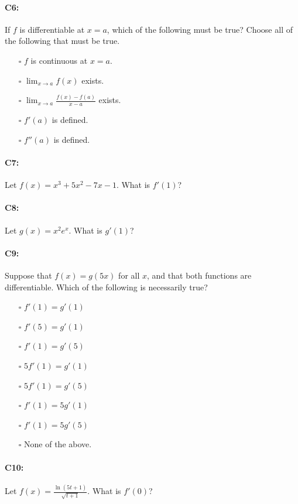 \documentclass[pdftex, brazil, 12pt, twoside]{article}
\begin{document}
\paragraph{C6:} If $f$ is differentiable at $x=a$, which of the following must be true? Choose all of the following that must be true.

\begin{itemize}[noitemsep]
\item[$\square$] $f$ is continuous at $x=a$.
\item[$\square$] $\lim_{x \to a} f(x)$ exists.
\item[$\square$] $\lim_{x \to a} \frac{f(x) - f(a)}{x-a}$ exists.
\item[$\square$] $f'(a)$ is defined.
\item[$\square$] $f''(a)$ is defined.
\end{itemize}

\paragraph{C7:} Let $f(x)=x^3 + 5x^2 -7x -1$. What is $f'(1)$?

\paragraph{C8:} Let $g(x) = x^2e^x$. What is $g'(1)$?

\paragraph{C9:} Suppose that $f(x) = g(5x)$ for all $x$, and that both functions
are differentiable. Which of the following is necessarily true?

\begin{itemize}[noitemsep]
\item[$\square$] $f'(1) = g'(1)$
\item[$\square$] $f'(5) = g'(1)$
\item[$\square$] $f'(1) = g'(5)$
\item[$\square$] $5f'(1) = g'(1)$
\item[$\square$] $5f'(1) = g'(5)$
\item[$\square$] $f'(1) = 5g'(1)$
\item[$\square$] $f'(1) = 5g'(5)$
\item[$\square$] None of the above.
\end{itemize}

\paragraph{C10:} Let $\displaystyle f(x) = \frac{\ln{(5t+1)}}{\sqrt{t+1}}$. What is $f'(0)$?
\end{document}
